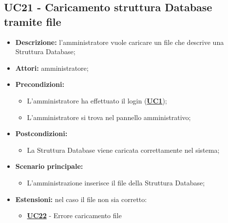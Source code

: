 \subsection{UC21 - Caricamento struttura Database tramite file}
\label{sec:UC21}
\begin{itemize}
	\item \textbf{Descrizione:} l’amministratore vuole caricare un file che descrive una Struttura Database;
	\item \textbf{Attori:} amministratore;
	\item \textbf{Precondizioni:} 
	\begin{itemize}
		\item L’amministratore ha effettuato il login (\hyperref[sec:UC1]{\textbf{UC1}});
		\item L’amministratore si trova nel pannello amministrativo;
	\end{itemize}
	\item \textbf{Postcondizioni:} 
	\begin{itemize}
		\item La Struttura Database viene caricata correttamente nel sistema;
	\end{itemize}
	\item \textbf{Scenario principale:} 
	\begin{itemize}
		\item L'amministrazione inserisce il file della Struttura Database;
	\end{itemize}
	\item \textbf{Estensioni:} nel caso il file non sia corretto:
	\begin{itemize}
		\item \hyperref[sec:UC22]{\textbf{UC22}} - Errore caricamento file
	\end{itemize}
\end{itemize}

